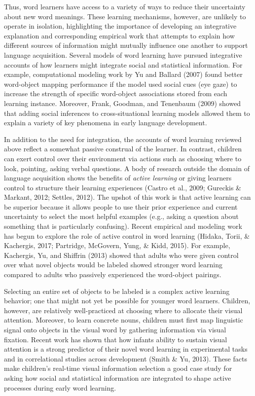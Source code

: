 \documentclass[man,floatsintext]{apa6}
\begin{document}
Thus, word learners have access to a variety of ways to reduce their
uncertainty about new word meanings. These learning mechanisms, however,
are unlikely to operate in isolation, highlighting the importance of
developing an integrative explanation and corresponding empirical work
that attempts to explain how different sources of information might
mutually influence one another to support language acquisition. Several
models of word learning have pursued integrative accounts of how
learners might integrate social and statistical information. For
example, computational modeling work by Yu and Ballard (2007) found
better word-object mapping performance if the model used social cues
(eye gaze) to increase the strength of specific word-object associations
stored from each learning instance. Moreover, Frank, Goodman, and
Tenenbaum (2009) showed that adding social inferences to
cross-situational learning models allowed them to explain a variety of
key phenomena in early language development.

In addition to the need for integration, the accounts of word learning
reviewed above reflect a somewhat passive construal of the learner. In
contrast, children can exert control over their environment via actions
such as choosing where to look, pointing, asking verbal questions. A
body of research outside the domain of language acquisition shows the
benefits of \emph{active learning} or giving learners control to
structure their learning experiences (Castro et al., 2009; Gureckis \&
Markant, 2012; Settles, 2012). The upshot of this work is that active
learning can be superior because it allows people to use their prior
experience and current uncertainty to select the most helpful examples
(e.g., asking a question about something that is particularly
confusing). Recent empirical and modeling work has begun to explore the
role of active control in word learning (Hidaka, Torii, \& Kachergis,
2017; Partridge, McGovern, Yung, \& Kidd, 2015). For example, Kachergis,
Yu, and Shiffrin (2013) showed that adults who were given control over
what novel objects would be labeled showed stronger word learning
compared to adults who passively experienced the word-object pairings.

Selecting an entire set of objects to be labeled is a complex active
learning behavior; one that might not yet be possible for younger word
learners. Children, however, are relatively well-practiced at choosing
where to allocate their visual attention. Moreover, to learn concrete
nouns, children must first map linguistic signal onto objects in the
visual word by gathering information via visual fixation. Recent work
has shown that how infants ability to sustain visual attention is a
strong predictor of their novel word learning in experimental tasks and
in correlational studies across development (Smith \& Yu, 2013). These
facts make children's real-time visual information selection a good case
study for asking how social and statistical information are integrated
to shape active processes during early word learning.
\end{document}
